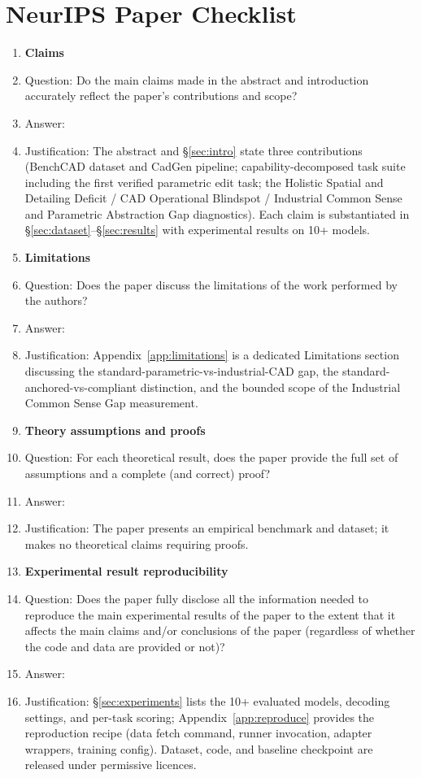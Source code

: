 
\clearpage
\section*{NeurIPS Paper Checklist}

\begin{enumerate}

\item {\bf Claims}
    \item[] Question: Do the main claims made in the abstract and introduction accurately reflect the paper's contributions and scope?
    \item[] Answer: \answerYes{}
    \item[] Justification: The abstract and \S\ref{sec:intro} state three contributions (BenchCAD dataset and CadGen pipeline; capability-decomposed task suite including the first verified parametric edit task; the Holistic Spatial and Detailing Deficit / CAD Operational Blindspot / Industrial Common Sense and Parametric Abstraction Gap diagnostics). Each claim is substantiated in \S\ref{sec:dataset}--\S\ref{sec:results} with experimental results on 10+ models.

\item {\bf Limitations}
    \item[] Question: Does the paper discuss the limitations of the work performed by the authors?
    \item[] Answer: \answerYes{}
    \item[] Justification: Appendix~\ref{app:limitations} is a dedicated Limitations section discussing the standard-parametric-vs-industrial-CAD gap, the standard-anchored-vs-compliant distinction, and the bounded scope of the Industrial Common Sense Gap measurement.

\item {\bf Theory assumptions and proofs}
    \item[] Question: For each theoretical result, does the paper provide the full set of assumptions and a complete (and correct) proof?
    \item[] Answer: \answerNA{}
    \item[] Justification: The paper presents an empirical benchmark and dataset; it makes no theoretical claims requiring proofs.

    \item {\bf Experimental result reproducibility}
    \item[] Question: Does the paper fully disclose all the information needed to reproduce the main experimental results of the paper to the extent that it affects the main claims and/or conclusions of the paper (regardless of whether the code and data are provided or not)?
    \item[] Answer: \answerYes{}
    \item[] Justification: \S\ref{sec:experiments} lists the 10+ evaluated models, decoding settings, and per-task scoring; Appendix~\ref{app:reproduce} provides the reproduction recipe (data fetch command, runner invocation, adapter wrappers, training config). Dataset, code, and baseline checkpoint are released under permissive licences.



\end{enumerate}
